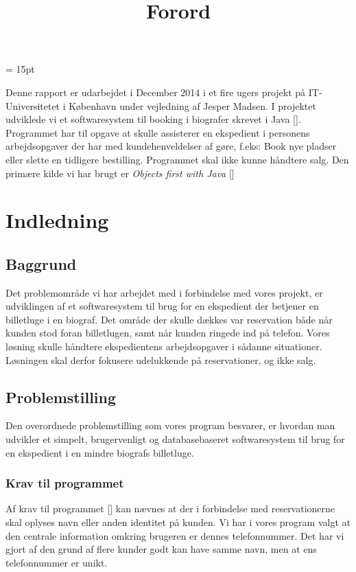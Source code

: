 \documentclass[final]{report}
\begin{document}
\begin{titlepage}

\end{titlepage}






 
\baselineskip= 15pt

\title{Forord}
Denne rapport er udarbejdet i December 2014 i et fire ugers projekt på IT-Universitetet i København under vejledning af Jesper Madsen.
I projektet udviklede vi et softwaresystem til booking i biografer skrevet i Java [\cite{Java}]. Programmet har til opgave at skulle assisterer en ekspedient i personens arbejdsopgaver der har med kundehenveldelser af gøre, f.eks: Book nye pladser eller slette en tidligere bestilling. Programmet skal ikke kunne håndtere salg. Den primære kilde vi har brugt er \emph{Objects first with Java} [\cite{blueJ}]

\tableofcontents

\chapter{Indledning}
\section{Baggrund}
Det problemområde vi har arbejdet med i forbindelse med vores projekt, er udviklingen af et softwaresystem til brug for en ekspedient der betjener en billetluge i en biograf. Det område der skulle dækkes var reservation både når kunden stod foran billetlugen, samt når kunden ringede ind på telefon. Vores løsning skulle håndtere   ekspedientens arbejdsopgaver i sådanne situationer. Løsningen skal derfor fokusere udelukkende på reservationer, og ikke salg. 

\section{Problemstilling}
Den overordnede problemstilling som vores program besvarer, er hvordan man udvikler et simpelt, brugervenligt og databasebaseret softwaresystem til brug for en ekspedient i en mindre biografs billetluge. 

\subsection{Krav til programmet}
Af krav til programmet [\cite{opg}] kan nævnes at der i forbindelse med reservationerne skal oplyses navn eller anden identitet på kunden. Vi har i vores program valgt at den centrale information omkring brugeren er dennes telefonnummer. Det har vi gjort af den grund af flere kunder godt kan have samme navn, men at ens telefonnummer er unikt.  
\end{document}
